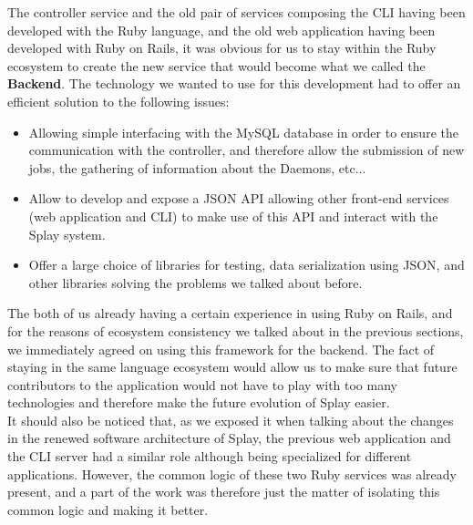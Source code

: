 \documentclass{eplmastersthesis}
\begin{document}
        The controller service and the old pair of services composing the CLI
        having been developed with the Ruby language, and the old web
        application having been developed with Ruby on Rails, it was obvious
        for us to stay within the Ruby ecosystem to create the new service
        that would become what we called the \textbf{Backend}. The technology
        we wanted to use for this development had to offer an efficient
        solution to the following issues:

        \begin{itemize}
          \item Allowing simple interfacing with the MySQL database in order
          to ensure the communication with the controller, and therefore allow
          the submission of new jobs, the gathering of information about the
          Daemons, etc...
          \item Allow to develop and expose a JSON API allowing other front-end
          services (web application and CLI) to make use of this API and
          interact with the Splay system.
          \item Offer a large choice of libraries for testing, data
          serialization using JSON, and other libraries solving the problems
          we talked about before.
        \end{itemize}

        The both of us already having a certain experience in using Ruby on
        Rails, and for the reasons of ecosystem consistency we talked about
        in the previous sections, we immediately agreed on using this
        framework for the backend. The fact of staying in the same language
        ecosystem would allow us to make sure that future contributors to
        the application would not have to play with too many technologies and
        therefore make the future evolution of Splay easier.\\
        It should also be noticed that, as we exposed it when talking about the
        changes in the renewed software architecture of Splay, the previous
        web application and the CLI server had a similar role although being
        specialized for different applications. However, the common logic
        of these two Ruby services was already present, and a part of the
        work was therefore just the matter of isolating this common logic
        and making it better.\\
\end{document}
